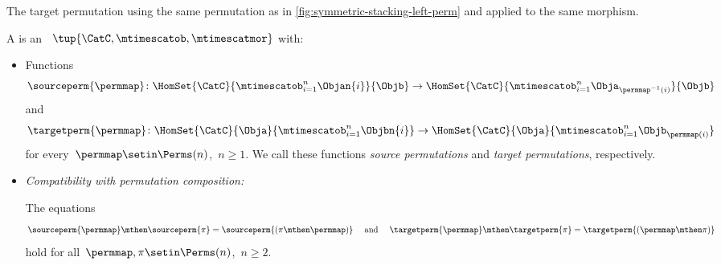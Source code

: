 \begin{marginfigure}
    \centering
    \caption{The target permutation using the same permutation as in \cref{fig:symmetric-stacking-left-perm} and applied to the same morphism.}
    \label{fig:symmetric-stacking-target-perm}
\end{marginfigure}
\begin{ctdefinition}
    \label{def:symmetric-stacking-category}
    A  is an  ~$\tup{\CatC, \mtimescatob, \mtimescatmor}$ with:

    \constit

    \begin{itemize}
        \item Functions
              \begin{equation}
                  \sourceperm{\permmap} \colon \HomSet{\CatC}{\mtimescatob_{i=1}^n \Objan{i}}{\Objb} \to \HomSet{\CatC}{\mtimescatob_{i=1}^n \Obja_{\permmap^{-1}(i)}}{\Objb}
              \end{equation}
              and
              \begin{equation}
                  \targetperm{\permmap} \colon \HomSet{\CatC}{\Obja}{\mtimescatob_{i=1}^n \Objbn{i}} \to \HomSet{\CatC}{\Obja}{\mtimescatob_{i=1}^n \Objb_{\permmap(i)}}
              \end{equation}
              for every~$\permmap \setin \Perms(n)$,~$n \geq 1$.
              We call these functions \emph{source permutations} and \emph{target permutations}, respectively.
    \end{itemize}

    \condit

    \begin{itemize}

        \item \emph{Compatibility with permutation composition:}

              The equations
              \begin{equation}
                  \label{eq:perm-compatibility-with-perm-comp}
                  \sourceperm{\permmap} \mthen \sourceperm{\pi} = \sourceperm{(\pi\mthen\permmap)}
                  \quad \text{ and } \quad
                  \targetperm{\permmap} \mthen \targetperm{\pi} = \targetperm{(\permmap \mthen \pi)}
              \end{equation}
              hold for all~$\permmap, \pi \setin \Perms(n)$,~$n \geq 2$.


\end{itemize}
\end{ctdefinition}
